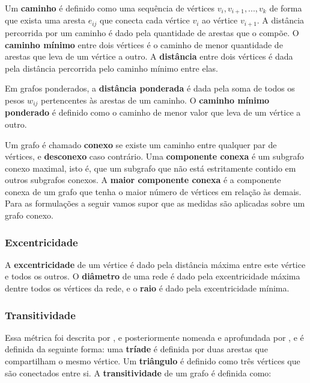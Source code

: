 Um \textbf{caminho} é definido como uma sequência de vértices $v_i, v_{i+1}, ..., v_k$ de forma que exista uma aresta $e_{ij}$ que conecta cada vértice $v_i$ ao vértice $v_{i+1}$. A distância percorrida por um caminho é dado pela quantidade de arestas que o compõe. O \textbf{caminho mínimo} entre dois vértices é o caminho de menor quantidade de arestas que leva de um vértice a outro. A \textbf{distância} entre dois vértices é dada pela distância percorrida pelo caminho mínimo entre elas.

Em grafos ponderados, a \textbf{distância ponderada} é dada pela soma de todos os pesos $w_{ij}$ pertencentes às arestas de um caminho. O \textbf{caminho mínimo ponderado} é definido como o caminho de menor valor que leva de um vértice a outro.

Um grafo é chamado \textbf{conexo} se existe um caminho entre qualquer par de vértices, e \textbf{desconexo} caso contrário. Uma \textbf{componente conexa} é um subgrafo conexo maximal, isto é, que um subgrafo que não está estritamente contido em outros subgrafos conexos. A \textbf{maior componente conexa} é a componente conexa de um grafo que tenha o maior número de vértices em relação às demais. Para as formulações a seguir vamos supor que as medidas são aplicadas sobre um grafo conexo.

\subsubsection{Excentricidade}
\label{section:metodologia:redes:metricas:excentricidade}

A \textbf{excentricidade} de um vértice é dado pela distância máxima entre este vértice e todos os outros. O \textbf{diâmetro} de uma rede é dado pela excentricidade máxima dentre todos os vértices da rede, e o \textbf{raio} é dado pela excentricidade mínima.

\subsubsection{Transitividade}
\label{section:metodologia:redes:metricas:transitividade}

Essa métrica foi descrita por , e posteriormente nomeada e aprofundada por , e é definida da seguinte forma: uma \textbf{tríade} é definida por duas arestas que compartilham o mesmo vértice. Um \textbf{triângulo} é definido como três vértices que são conectados entre si. A \textbf{transitividade} de um grafo é definida como:


